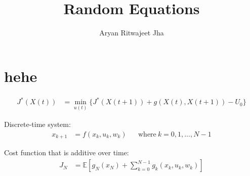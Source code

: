 \documentclass[]{article}
\title{Random Equations}
\author{Aryan Ritwajeet Jha}
\date{}
\newcommand{\expect}[1]{\mathbb{E}\left[#1\right]}
\begin{document}
\maketitle

\section*{hehe}

\begin{align}
	J^{*}(X(t)) &= \min_{u(t)} \biggl\{{ J^{*}(X(t+1)) + g(X(t), X(t+1)) - U_0}\biggr\} \nonumber
\end{align}

Discrete-time system:
\begin{align}
	x_{k+1} &= f(x_k, u_k, w_k)&     &\text{where}\ k = 0, 1, \ldots, N-1 \nonumber 
\end{align}

Cost function that is additive over time:
\begin{align}
	J_N &= \expect{ g_N(x_N) + \sum_{k=0}^{N-1}g_k(x_k, u_k, w_k) } \nonumber
\end{align}
\end{document}
